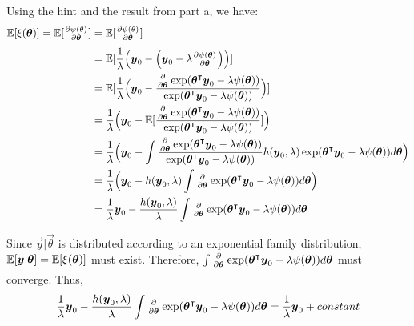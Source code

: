 
Using the hint and the result from part a, we have:
\begin{align*}
    \expec{\xi({\vec{\theta}})} = \expec{\partiald{\psi(\theta)}{\vec{\theta}}} 
    &= \expec{\partiald{\psi(\theta)}{\vec{\theta}}}\\
    &= \expec{\frac{1}{\lambda}\Big(\vec{y}_0- \Big(\vec{y}_0-\lambda\partiald{\psi(\vec{\theta})}{\vec{\theta}}\Big)\Big)}\\
    &= \expec{\frac{1}{\lambda}\Big(\vec{y}_0- 
    \frac{\partiald{}{\vec{\theta}}\exp(\vec{\theta}\tp\vec{y}_0 - \lambda\psi(\vec{\theta}))}{\exp(\vec{\theta}\tp\vec{y}_0 - \lambda\psi(\vec{\theta}))}\Big)}\\
    &= \frac{1}{\lambda}\Big(\vec{y}_0- 
    \expec{\frac{\partiald{}{\vec{\theta}}\exp(\vec{\theta}\tp\vec{y}_0 - \lambda\psi(\vec{\theta}))}{\exp(\vec{\theta}\tp\vec{y}_0 - \lambda\psi(\vec{\theta}))}}\Big)\\
    &= \frac{1}{\lambda}\Big(\vec{y}_0- 
    \int{\frac{\partiald{}{\vec{\theta}}\exp(\vec{\theta}\tp\vec{y}_0 - \lambda\psi(\vec{\theta}))}
{\exp(\vec{\theta}\tp\vec{y}_0 - \lambda\psi(\vec{\theta}))}h(\vec{y}_0,\lambda)\exp(\vec{\theta}\tp\vec{y}_0 - \lambda\psi(\vec{\theta}))d\vec{\theta}}\Big)\\
    &= \frac{1}{\lambda}\Big(\vec{y}_0- 
    h(\vec{y}_0,\lambda)\int{\partiald{}{\vec{\theta}}\exp(\vec{\theta}\tp\vec{y}_0 - \lambda\psi(\vec{\theta}))}d\vec{\theta}\Big)\\
    &= \frac{1}{\lambda}\vec{y}_0-\frac{h(\vec{y}_0,\lambda)}{\lambda}
       \int{
           \partiald{}{\vec{\theta}}\exp(\vec{\theta}\tp\vec{y}_0 - \lambda\psi(\vec{\theta}))
       }d\vec{\theta}\\
\end{align*}

Since $\vec{y}\vert\vec{\theta}$ is distributed according to an exponential family distribution, $\underset{\scriptscriptstyle{}}{\mathbb{E}}[\boldsymbol{y}\vert\boldsymbol{\theta}] =\underset{\scriptscriptstyle{}}{\mathbb{E}}[\xi(\boldsymbol{\theta})]$ must exist.
Therefore, $\int{\partiald{}{\vec{\theta}}\exp(\vec{\theta}\tp\vec{y}_0 - \lambda\psi(\vec{\theta}))}d\vec{\theta}$ must converge.
Thus, 
\begin{align*}
     \frac{1}{\lambda}\vec{y}_0- 
\frac{h(\vec{y}_0,\lambda)}{\lambda}\int{\partiald{}{\vec{\theta}}\exp(\vec{\theta}\tp\vec{y}_0 - \lambda\psi(\vec{\theta}))}d\vec{\theta} = \frac{1}{\lambda}\vec{y}_0 + constant
\end{align*}


